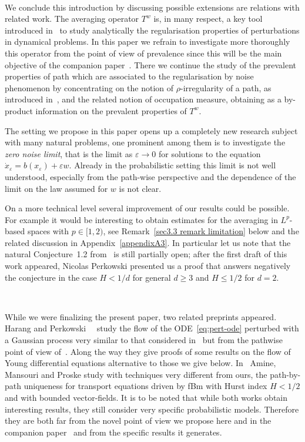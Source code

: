 \documentclass[10pt]{article}
\newcommand{\tmtextit}[1]{{\itshape{#1}}}
\begin{document}
\

We conclude this introduction by discussing possible extensions are relations
with related work. The averaging operator $T^w$ is, in many respect, a key
tool introduced in~{\cite{catelliergubinelli}} to study analytically the
regularisation properties of perturbations in dynamical problems. In this
paper we refrain to investigate more thoroughly this operator from the point
of view of prevalence since this will be the main objective of the companion
paper~{\cite{galeatigubinelli}}. There we continue the study of the prevalent
properties of path which are associated to the regularisation by noise
phenomenon by concentrating on the notion of $\rho$\mbox{-}irregularity of a
path, as introduced in~{\cite{catelliergubinelli}}, and the related notion of
occupation measure, obtaining as a by-product information on the prevalent
properties of $T^w$.

The setting we propose in this paper opens up a completely new research
subject with many natural problems, one prominent among them is to investigate
the \tmtextit{zero noise limit}, that is the limit as $\varepsilon \rightarrow
0$ for solutions to the equation $\dot{x}_{\varepsilon} = b (x_{\varepsilon})
+ \varepsilon w$. Already in the probabilistic setting this limit is not well
understood, especially from the path-wise perspective and the dependence of
the limit on the law assumed for $w$ is not clear.

On a more technical level several improvement of our results could be
possible. For example it would be interesting to obtain estimates for the
averaging in $L^p$\mbox{-}based spaces with $p \in [1, 2)$, see
Remark~\ref{sec3.3 remark limitation} below and the related discussion in
Appendix~\ref{appendixA3}. In particular let us note that the natural
Conjecture~1.2 from~{\cite{catelliergubinelli}} is still partially open; after
the first draft of this work appeared, Nicolas Perkowski presented us a proof
that answers negatively the conjecture in the case $H < 1 / d$ for general $d
\geqslant 3$ and $H \leqslant 1 / 2$ for $d = 2$.

\

While we were finalizing the present paper, two related preprints appeared.
Harang and Perkowski~{\cite{perkowski}} \ study the flow of the
ODE~{\eqref{eq:pert-ode}} perturbed with a Gaussian process very similar to
that considered in~{\cite{banosproske}} but from the pathwise point of view
of~{\cite{catelliergubinelli}}. Along the way they give proofs of some results
on the flow of Young differential equations alternative to those we give
below. In~{\cite{amine2020}} Amine, Mansouri and Proske study with techniques
very different from ours, the path-by-path uniqueness for transport equations
driven by fBm with Hurst index $H < 1 / 2$ and with bounded vector-fields. It
is to be noted that while both works obtain interesting results, they still
consider very specific probabilistic models. Therefore they are both far from
the novel point of view we propose here and in the companion
paper~{\cite{galeatigubinelli}} and from the specific results it generates.
\end{document}
